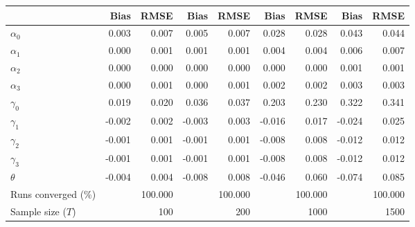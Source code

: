 
\begin{tabular}[t]{lrrrrrrrr}
\toprule
  & Bias & RMSE & Bias & RMSE & Bias & RMSE & Bias & RMSE\\
\midrule
$\alpha_{0}$ & 0.003 & 0.007 & 0.005 & 0.007 & 0.028 & 0.028 & 0.043 & 0.044\\
$\alpha_{1}$ & 0.000 & 0.001 & 0.001 & 0.001 & 0.004 & 0.004 & 0.006 & 0.007\\
$\alpha_{2}$ & 0.000 & 0.000 & 0.000 & 0.000 & 0.000 & 0.000 & 0.001 & 0.001\\
$\alpha_{3}$ & 0.000 & 0.001 & 0.000 & 0.001 & 0.002 & 0.002 & 0.003 & 0.003\\
$\gamma_{0}$ & 0.019 & 0.020 & 0.036 & 0.037 & 0.203 & 0.230 & 0.322 & 0.341\\
$\gamma_{1}$ & -0.002 & 0.002 & -0.003 & 0.003 & -0.016 & 0.017 & -0.024 & 0.025\\
$\gamma_{2}$ & -0.001 & 0.001 & -0.001 & 0.001 & -0.008 & 0.008 & -0.012 & 0.012\\
$\gamma_{3}$ & -0.001 & 0.001 & -0.001 & 0.001 & -0.008 & 0.008 & -0.012 & 0.012\\
$\theta$ & -0.004 & 0.004 & -0.008 & 0.008 & -0.046 & 0.060 & -0.074 & 0.085\\
Runs converged (\%) &  & 100.000 &  & 100.000 &  & 100.000 &  & 100.000\\
Sample size ($T$) &  & 100 &  & 200 &  & 1000 &  & 1500\\
\bottomrule
\end{tabular}
